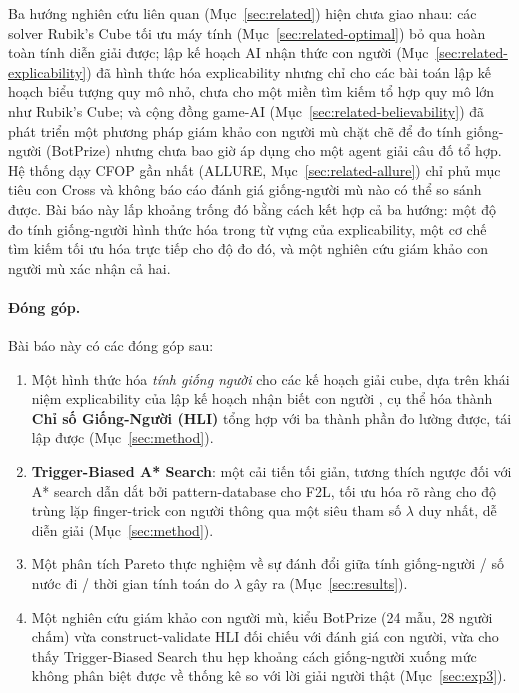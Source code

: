 \documentclass[10pt,conference]{article}
\begin{document}
Ba hướng nghiên cứu liên quan (Mục~\ref{sec:related}) hiện chưa giao
nhau: các solver Rubik's Cube tối ưu máy tính
(Mục~\ref{sec:related-optimal}) bỏ qua hoàn toàn tính diễn giải được;
lập kế hoạch AI nhận thức con người (Mục~\ref{sec:related-explicability})
đã hình thức hóa explicability nhưng chỉ cho các bài toán lập kế hoạch
biểu tượng quy mô nhỏ, chưa cho một miền tìm kiếm tổ hợp quy mô lớn
như Rubik's Cube; và cộng đồng game-AI (Mục~\ref{sec:related-believability})
đã phát triển một phương pháp giám khảo con người mù chặt chẽ để đo
tính giống-người (BotPrize) nhưng chưa bao giờ áp dụng cho một agent
giải câu đố tổ hợp. Hệ thống dạy CFOP gần nhất (ALLURE,
Mục~\ref{sec:related-allure}) chỉ phủ mục tiêu con Cross và không báo
cáo đánh giá giống-người mù nào có thể so sánh được. Bài báo này lấp
khoảng trống đó bằng cách kết hợp cả ba hướng: một độ đo tính
giống-người hình thức hóa trong từ vựng của explicability, một cơ chế
tìm kiếm tối ưu hóa trực tiếp cho độ đo đó, và một nghiên cứu giám
khảo con người mù xác nhận cả hai.

\paragraph{Đóng góp.} Bài báo này có các đóng góp sau:
\begin{enumerate}
  \item Một hình thức hóa \emph{tính giống người} cho các kế hoạch giải
    cube, dựa trên khái niệm explicability của lập kế hoạch nhận biết
    con người \citep{kulkarni2016,chakraborti2019}, cụ thể hóa thành
    \textbf{Chỉ số Giống-Người (HLI)} tổng hợp với ba thành phần đo
    lường được, tái lập được (Mục~\ref{sec:method}).
  \item \textbf{Trigger-Biased A* Search}: một cải tiến tối giản, tương
    thích ngược đối với A* search dẫn dắt bởi pattern-database cho F2L,
    tối ưu hóa rõ ràng cho độ trùng lặp finger-trick con người thông
    qua một siêu tham số $\lambda$ duy nhất, dễ diễn giải
    (Mục~\ref{sec:method}).
  \item Một phân tích Pareto thực nghiệm về sự đánh đổi giữa tính
    giống-người / số nước đi / thời gian tính toán do $\lambda$ gây ra
    (Mục~\ref{sec:results}).
  \item Một nghiên cứu giám khảo con người mù, kiểu BotPrize
    \citep{hingston2009} (24 mẫu, 28 người chấm) vừa construct-validate
    HLI đối chiếu với đánh giá con người, vừa cho thấy Trigger-Biased
    Search thu hẹp khoảng cách giống-người xuống mức không phân biệt
    được về thống kê so với lời giải người thật (Mục~\ref{sec:exp3}).
\end{enumerate}
\end{document}
